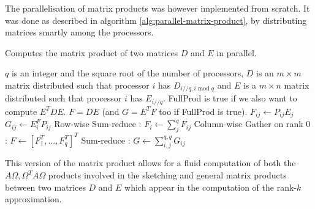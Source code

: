 \documentclass[a4paper, 12pt,oneside]{article}
\begin{document}
	The parallelisation of matrix products was however implemented from scratch. It was done as described in algorithm \ref{alg:parallel-matrix-product}, by distributing matrices smartly among the processors. 
	\begin{algorithm}[H]
		\caption{Computes the matrix product of two matrices $D$ and $E$ in parallel.}\label{alg:parallel-matrix-product}
		\begin{algorithmic}
		\Require $q$ is an integer and the square root of the number of processors, $D$ is an $m\times m$ matrix distributed such that processor $i$ has $D_{i//q,i\text{ mod }q}$ and $E$ is a $m\times n$ matrix distributed such that processor $i$ has $E_{i//q}$. FullProd is true if we also want to compute $E^TDE$.
		\Ensure $F=DE$ (and $G=E^TF$ too if FullProd is true). 
		\State $F_{ij} \gets P_{ij}E_j$
			\State $G_{ij} \gets E_i^FP_{ij}$
		\EndIf		
		\State Row-wise Sum-reduce : $F_i\gets \sum_j^q F_{ij}$
		\State Column-wise Gather on rank 0 : $F\gets [F_1^T,...,F_q^T]^T$
			\State Sum-reduce : $G\gets \sum_{i,j}^{q,q} G_{ij}$
		\EndIf
		\end{algorithmic}
	\end{algorithm}
	This version of the matrix product allows for a fluid computation of both the $A \Omega,\Omega^T A \Omega$ products involved in the sketching and general matrix products between two matrices $D$ and $E$ which appear in the computation of the rank-$k$ approximation. 
	
\end{document}
